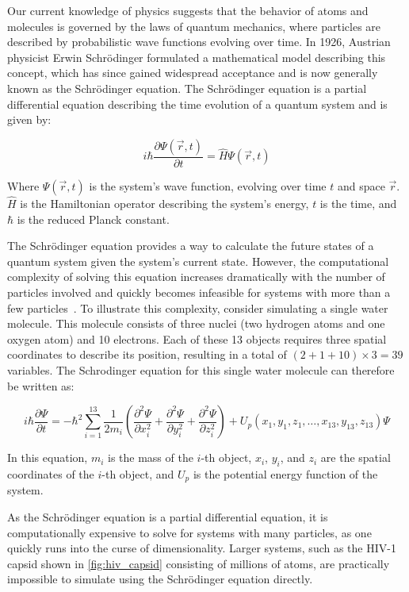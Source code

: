 Our current knowledge of physics suggests that the behavior of atoms and molecules is governed by the laws of quantum mechanics, where particles are described by probabilistic wave functions evolving over time. In 1926, Austrian physicist Erwin Schrödinger formulated a mathematical model describing this concept, which has since gained widespread acceptance and is now generally known as the Schrödinger equation. The Schrödinger equation is a partial differential equation describing the time evolution of a quantum system and is given by:

\begin{equation}
      i \hbar \frac{\partial \Psi(\vec{r}, t)}{\partial t} = \hat{H} \Psi(\vec{r}, t)
\end{equation}

Where $\Psi(\vec{r}, t)$ is the system's wave function, evolving over time $t$ and space $\vec{r}$. $\hat{H}$ is the Hamiltonian operator describing the system's energy, $t$ is the time, and $\hbar$ is the reduced Planck constant.
\smallskip

The Schrödinger equation provides a way to calculate the future states of a quantum system given the system's current state. However, the computational complexity of solving this equation increases dramatically with the number of particles involved and quickly becomes infeasible for systems with more than a few particles~\cite{Leimkuhler2015}. To illustrate this complexity, consider simulating a single water molecule. This molecule consists of three nuclei (two hydrogen atoms and one oxygen atom) and 10 electrons. Each of these 13 objects requires three spatial coordinates to describe its position, resulting in a total of $(2+1+10) \times 3 = 39$ variables. The Schrodinger equation for this single water molecule can therefore be written as:

\begin{equation}
      i \hbar \frac{\partial \Psi}{\partial t} = -\hbar^2 \sum_{i=1}^{13} \frac{1}{2m_i} \left( \frac{\partial^2 \Psi}{\partial x_i^2} + \frac{\partial^2 \Psi}{\partial y_i^2} + \frac{\partial^2 \Psi}{\partial z_i^2} \right) + U_p (x_1, y_1, z_1, \ldots, x_{13}, y_{13}, z_{13}) \Psi
\end{equation}

In this equation, $m_i$ is the mass of the $i$-th object, $x_i$, $y_i$, and $z_i$ are the spatial coordinates of the $i$-th object, and $U_p$ is the potential energy function of the system.
\smallskip

As the Schrödinger equation is a partial differential equation, it is computationally expensive to solve for systems with many particles, as one quickly runs into the curse of dimensionality. Larger systems, such as the HIV-1 capsid shown in \autoref{fig:hiv_capsid} consisting of millions of atoms, are practically impossible to simulate using the Schrödinger equation directly.

